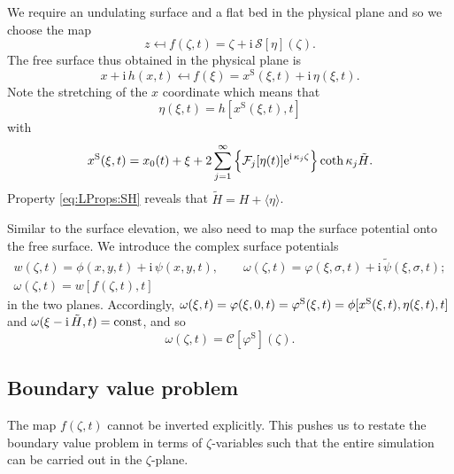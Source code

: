 \documentclass[a4paper,12pt]{article}
\newcommand{\mr}{\mathrm}
\newcommand{\mc}{\mathcal}
\renewcommand{\S}{^\mr{S}}
\newcommand{\ii}{\mr{i}\,}
\newcommand{\ee}{\mr{e}}
\renewcommand{\_}[1]{_\mr{#1}}
\let\Re\relax
\let\Im\relax
\DeclareMathOperator\Re{Re}
\DeclareMathOperator\Im{Im}
\newcommand{\w}{w}
\newcommand{\z}{z}
\newcommand{\x}{x}
\newcommand{\y}{y}
\newcommand{\zz}{\zeta}
\newcommand{\xx}{\xi}
\newcommand{\yy}{\sigma}
\newcommand{\kk}{\kappa}
\newcommand{\zmap}{f}
\newcommand{\ww}{\omega}
\renewcommand{\w}{w}
\newcommand{\Hz}{H}
\newcommand{\Hzz}{\tilde H}
\newcommand{\hzz}{\eta}
\newcommand{\hz}{h}
\newcommand{\Lsin}{\mc S}
\newcommand{\Lcos}{\mc C}
\newcommand{\FF}{\mc F}
\newcommand{\xS}{\x\S}
\begin{document}
We require an undulating surface and a flat bed in the physical plane 
and so we choose the map
\begin{equation}
\z\mapsfrom \zmap(\zz,t) = \zz+\ii\Lsin[\hzz](\zz).
\label{eq:zmap}
\end{equation}
The free surface thus obtained in the physical plane is
\[\x+\ii\hz(\x,t)\mapsfrom \zmap(\xx)=\xS(\xx,t)+\ii\hzz(\xx,t).\]
Note the stretching of the $\x$ coordinate which means that 
\begin{equation}
\hzz(\xx,t) = \hz[\xS(\xx,t),t]
\label{eq:hzz}
\end{equation}
 with 
\[\xS(\xx,t)=\x_0(t)+\xx+2\sum_{j=1}^\infty \Im\Big\{\FF_j[\hzz(t)] \ee^{\ii \kk_j\zz}\Big\}\coth\kk_j\Hzz.\] 
Property \eqref{eq:LProps:SH} reveals that $\Hzz = \Hz+\langle\eta\rangle$.

Similar to the surface elevation, we also need to map the surface potential onto the free surface.
We introduce the complex surface potentials  
\begin{subequations}
\begin{gather}
\w(\zz,t)=\phi(\x,\y,t)+\ii\psi(\x,\y,t),
\qquad
\ww(\zz,t)=\varphi(\xx,\yy,t)+\ii\tilde\psi(\xx,\yy,t);
\\
\ww(\zz,t)=\w[\zmap(\zz,t),t] \label{eq:ww:match}
\end{gather}%
\end{subequations}%
in the two planes.
Accordingly, 
$\Re \ww(\xx,t)=\varphi(\xx,0,t)=\varphi\S(\xx,t)=\phi[\xS(\xx,t),\hzz(\xx,t),t]$
 and $\Im \ww(\xx-\ii \Hzz,t)=\mr{const}$, and so
\begin{equation}
\ww(\zz,t) = \Lcos[\varphi\S](\zz).
\label{eq:ww}
\end{equation}


\subsection*{Boundary value problem}
The map $\zmap(\zz,t)$ cannot be inverted explicitly. 
This pushes us to restate the boundary value problem in terms of $\zz$-variables such that the entire simulation can be carried out in the $\zz$-plane.
\end{document}
